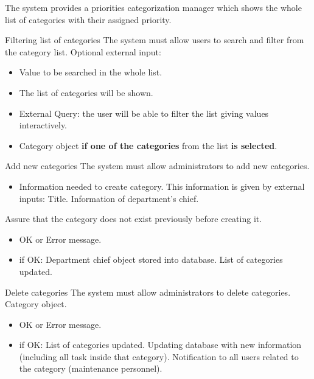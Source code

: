 
The system provides a priorities categorization manager which shows the whole list of categories with their assigned priority.

\begin{requirement}{Filtering list of categories}
\reqdesc The system must allow users to search and filter from the category list.
\reqin Optional external input:
\begin{itemize}
	\item Value to be searched in the whole list.
\end{itemize}
\reqout \begin{itemize}
	\item The list of categories will be shown.
	\item External Query: the user will be able to filter the list giving values interactively.
	\item Category object \textbf{if one of the categories} from the list \textbf{is selected}.
\end{itemize}
\end{requirement}


\begin{requirement}{Add new categories}
\reqdesc  The system must allow administrators to add new categories.
\reqin \begin{itemize}
	\item Information needed to create category. This information is given by external inputs:
		\subitem Title.
		\subitem Information of department's chief. 
\end{itemize}
\reqsteps Assure that the category does not exist previously before creating it.
\reqout \begin{itemize}
	\item OK or Error message.
	\item if OK:
		\subitem Department chief object stored into database.
		\subitem List of categories updated.
\end{itemize}
\end{requirement}

\begin{requirement}{Delete categories}
\reqdesc  The system must allow administrators to delete categories.
\reqin Category object.
\reqout \begin{itemize}
	\item OK or Error message.
	\item if OK:
		\subitem List of categories updated.
		\subitem Updating database with new information (including all task inside that category).
		\subitem Notification to all users related to the category (maintenance personnel).
\end{itemize}
\end{requirement}


